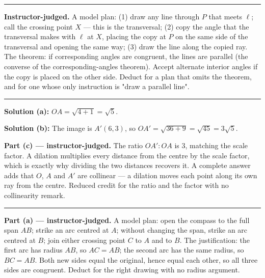\documentclass[12pt]{article}
\begin{document}
\vspace{0.15cm}
\noindent\rule{\linewidth}{0.2pt}


\textbf{Instructor-judged.} A model plan: (1) draw any line through $P$ that
meets $\ell$; call the crossing point $X$ --- this is the transversal;
(2) copy the angle that the transversal makes with $\ell$ at $X$, placing the
copy at $P$ on the same side of the transversal and opening the same way;
(3) draw the line along the copied ray. The theorem: if corresponding angles are
congruent, the lines are parallel (the converse of the corresponding-angles
theorem). Accept alternate interior angles if the copy is placed on the other
side. Deduct for a plan that omits the theorem, and for one whose only
instruction is "draw a parallel line".

\vspace{0.15cm}
\noindent\rule{\linewidth}{0.2pt}


\textbf{Solution (a):} $OA = \sqrt{4 + 1} = \sqrt{5}$. 

\textbf{Solution (b):} The image is $A'(6, 3)$, so
$OA' = \sqrt{36 + 9} = \sqrt{45} = 3\sqrt{5}$. 

\textbf{Part (c) --- instructor-judged.} The ratio $OA' : OA$ is $3$, matching
the scale factor. A dilation multiplies every distance from the centre by the
scale factor, which is exactly why dividing the two distances recovers it. A
complete answer adds that $O$, $A$ and $A'$ are collinear --- a dilation moves
each point along its own ray from the centre. Reduced credit for the ratio and
the factor with no collinearity remark.

\vspace{0.15cm}
\noindent\rule{\linewidth}{0.2pt}


\textbf{Part (a) --- instructor-judged.} A model plan: open the compass to the
full span $AB$; strike an arc centred at $A$; without changing the span, strike
an arc centred at $B$; join either crossing point $C$ to $A$ and to $B$. The
justification: the first arc has radius $AB$, so $AC = AB$; the second arc has
the same radius, so $BC = AB$. Both new sides equal the original, hence equal
each other, so all three sides are congruent. Deduct for the right drawing with
no radius argument.
\end{document}

